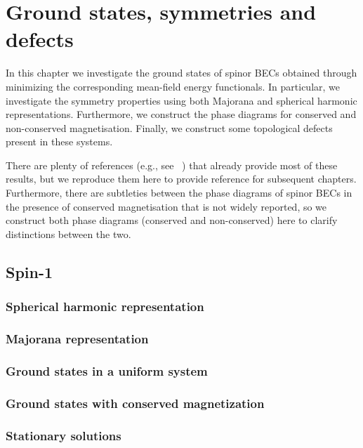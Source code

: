 \chapter{Ground states, symmetries and defects}
In this chapter we investigate the ground states of spinor BECs obtained through
minimizing the corresponding mean-field energy functionals.
In particular, we investigate the symmetry properties using both Majorana and
spherical harmonic representations.
Furthermore, we construct the phase diagrams for conserved and non-conserved
magnetisation.
Finally, we construct some topological defects present in these systems.

There are plenty of references (e.g., see ~\cite{Ciobanu2000, Zhang2003,
Kawaguchi2012, StamperKurn2013}) that already provide most of these results,
but we reproduce them here to provide reference for subsequent chapters.
Furthermore, there are subtleties between the phase diagrams of spinor BECs
in the presence of conserved magnetisation that is not widely reported, so we
construct both phase diagrams (conserved and non-conserved) here to clarify
distinctions between the two.


\section{Spin-1}

\subsection{Spherical harmonic representation}

\subsection{Majorana representation}

\subsection{Ground states in a uniform system}

\subsection{Ground states with conserved magnetization}

\subsection{Stationary solutions}

